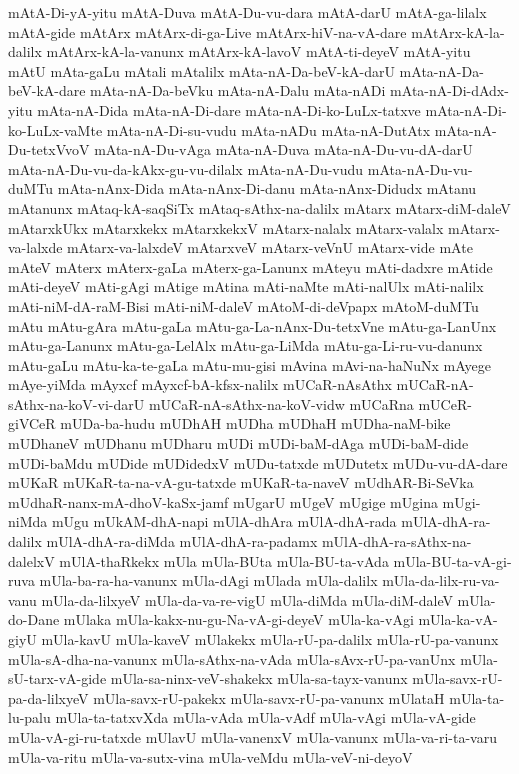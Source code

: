 {mAtA-Di-yA-yitu
mAtA-Duva
mAtA-Du-vu-dara
mAtA-darU
mAtA-ga-lilalx
mAtA-gide
mAtArx
mAtArx-di-ga-Live
mAtArx-hiV-na-vA-dare
mAtArx-kA-la-dalilx
mAtArx-kA-la-vanunx
mAtArx-kA-lavoV
mAtA-ti-deyeV
mAtA-yitu
mAtU
mAta-gaLu
mAtali
mAtalilx
mAta-nA-Da-beV-kA-darU
mAta-nA-Da-beV-kA-dare
mAta-nA-Da-beVku
mAta-nA-Dalu
mAta-nADi
mAta-nA-Di-dAdx-yitu
mAta-nA-Dida
mAta-nA-Di-dare
mAta-nA-Di-ko-LuLx-tatxve
mAta-nA-Di-ko-LuLx-vaMte
mAta-nA-Di-su-vudu
mAta-nADu
mAta-nA-DutAtx
mAta-nA-Du-tetxVvoV
mAta-nA-Du-vAga
mAta-nA-Duva
mAta-nA-Du-vu-dA-darU
mAta-nA-Du-vu-da-kAkx-gu-vu-dilalx
mAta-nA-Du-vudu
mAta-nA-Du-vu-duMTu
mAta-nAnx-Dida
mAta-nAnx-Di-danu
mAta-nAnx-Didudx
mAtanu
mAtanunx
mAtaq-kA-saqSiTx
mAtaq-sAthx-na-dalilx
mAtarx
mAtarx-diM-daleV
mAtarxkUkx
mAtarxkekx
mAtarxkekxV
mAtarx-nalalx
mAtarx-valalx
mAtarx-va-lalxde
mAtarx-va-lalxdeV
mAtarxveV
mAtarx-veVnU
mAtarx-vide
mAte
mAteV
mAterx
mAterx-gaLa
mAterx-ga-Lanunx
mAteyu
mAti-dadxre
mAtide
mAti-deyeV
mAti-gAgi
mAtige
mAtina
mAti-naMte
mAti-nalUlx
mAti-nalilx
mAti-niM-dA-raM-Bisi
mAti-niM-daleV
mAtoM-di-deVpapx
mAtoM-duMTu
mAtu
mAtu-gAra
mAtu-gaLa
mAtu-ga-La-nAnx-Du-tetxVne
mAtu-ga-LanUnx
mAtu-ga-Lanunx
mAtu-ga-LelAlx
mAtu-ga-LiMda
mAtu-ga-Li-ru-vu-danunx
mAtu-gaLu
mAtu-ka-te-gaLa
mAtu-mu-gisi
mAvina
mAvi-na-haNuNx
mAyege
mAye-yiMda
mAyxcf
mAyxcf-bA-kfsx-nalilx
mUCaR-nAsAthx
mUCaR-nA-sAthx-na-koV-vi-darU
mUCaR-nA-sAthx-na-koV-vidw
mUCaRna
mUCeR-giVCeR
mUDa-ba-hudu
mUDhAH
mUDha
mUDhaH
mUDha-naM-bike
mUDhaneV
mUDhanu
mUDharu
mUDi
mUDi-baM-dAga
mUDi-baM-dide
mUDi-baMdu
mUDide
mUDidedxV
mUDu-tatxde
mUDutetx
mUDu-vu-dA-dare
mUKaR
mUKaR-ta-na-vA-gu-tatxde
mUKaR-ta-naveV
mUdhAR-Bi-SeVka
mUdhaR-nanx-mA-dhoV-kaSx-jamf
mUgarU
mUgeV
mUgige
mUgina
mUgi-niMda
mUgu
mUkAM-dhA-napi
mUlA-dhAra
mUlA-dhA-rada
mUlA-dhA-ra-dalilx
mUlA-dhA-ra-diMda
mUlA-dhA-ra-padamx
mUlA-dhA-ra-sAthx-na-dalelxV
mUlA-thaRkekx
mUla
mUla-BUta
mUla-BU-ta-vAda
mUla-BU-ta-vA-gi-ruva
mUla-ba-ra-ha-vanunx
mUla-dAgi
mUlada
mUla-dalilx
mUla-da-lilx-ru-va-vanu
mUla-da-lilxyeV
mUla-da-va-re-vigU
mUla-diMda
mUla-diM-daleV
mUla-do-Dane
mUlaka
mUla-kakx-nu-gu-Na-vA-gi-deyeV
mUla-ka-vAgi
mUla-ka-vA-giyU
mUla-kavU
mUla-kaveV
mUlakekx
mUla-rU-pa-dalilx
mUla-rU-pa-vanunx
mUla-sA-dha-na-vanunx
mUla-sAthx-na-vAda
mUla-sAvx-rU-pa-vanUnx
mUla-sU-tarx-vA-gide
mUla-sa-ninx-veV-shakekx
mUla-sa-tayx-vanunx
mUla-savx-rU-pa-da-lilxyeV
mUla-savx-rU-pakekx
mUla-savx-rU-pa-vanunx
mUlataH
mUla-ta-lu-palu
mUla-ta-tatxvXda
mUla-vAda
mUla-vAdf
mUla-vAgi
mUla-vA-gide
mUla-vA-gi-ru-tatxde
mUlavU
mUla-vanenxV
mUla-vanunx
mUla-va-ri-ta-varu
mUla-va-ritu
mUla-va-sutx-vina
mUla-veMdu
mUla-veV-ni-deyoV
}
